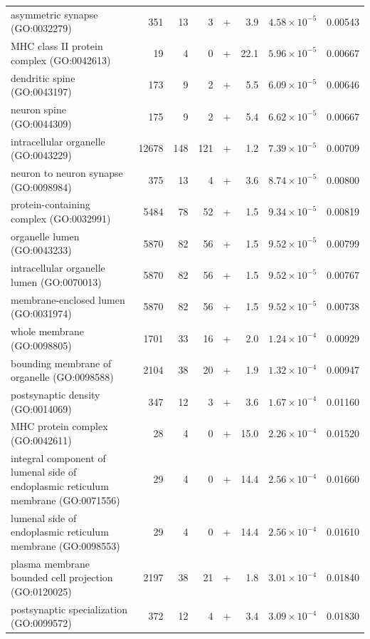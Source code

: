 \begin{table}[ht]
\begin{adjustbox}{width=\textwidth}
\begin{tabular}{lrrrlrrr}
  asymmetric synapse (GO:0032279) & 351 & 13 & 3 & + & 3.9 & $4.58 \times 10^{-5}$ & 0.00543 \\ 
  MHC class II protein complex (GO:0042613) & 19 & 4 & 0 & + & 22.1 & $5.96 \times 10^{-5}$ & 0.00667 \\ 
  dendritic spine (GO:0043197) & 173 & 9 & 2 & + & 5.5 & $6.09 \times 10^{-5}$ & 0.00646 \\ 
  neuron spine (GO:0044309) & 175 & 9 & 2 & + & 5.4 & $6.62 \times 10^{-5}$ & 0.00667 \\ 
  intracellular organelle (GO:0043229) & 12678 & 148 & 121 & + & 1.2 & $7.39 \times 10^{-5}$ & 0.00709 \\ 
  neuron to neuron synapse (GO:0098984) & 375 & 13 & 4 & + & 3.6 & $8.74 \times 10^{-5}$ & 0.00800 \\ 
  protein-containing complex (GO:0032991) & 5484 & 78 & 52 & + & 1.5 & $9.34 \times 10^{-5}$ & 0.00819 \\ 
  organelle lumen (GO:0043233) & 5870 & 82 & 56 & + & 1.5 & $9.52 \times 10^{-5}$ & 0.00799 \\ 
  intracellular organelle lumen (GO:0070013) & 5870 & 82 & 56 & + & 1.5 & $9.52 \times 10^{-5}$ & 0.00767 \\ 
  membrane-enclosed lumen (GO:0031974) & 5870 & 82 & 56 & + & 1.5 & $9.52 \times 10^{-5}$ & 0.00738 \\ 
  whole membrane (GO:0098805) & 1701 & 33 & 16 & + & 2.0 & $1.24 \times 10^{-4}$ & 0.00929 \\ 
  bounding membrane of organelle (GO:0098588) & 2104 & 38 & 20 & + & 1.9 & $1.32 \times 10^{-4}$ & 0.00947 \\ 
  postsynaptic density (GO:0014069) & 347 & 12 & 3 & + & 3.6 & $1.67 \times 10^{-4}$ & 0.01160 \\ 
  MHC protein complex (GO:0042611) & 28 & 4 & 0 & + & 15.0 & $2.26 \times 10^{-4}$ & 0.01520 \\ 
  integral component of lumenal side of endoplasmic reticulum membrane (GO:0071556) & 29 & 4 & 0 & + & 14.4 & $2.56 \times 10^{-4}$ & 0.01660 \\ 
  lumenal side of endoplasmic reticulum membrane (GO:0098553) & 29 & 4 & 0 & + & 14.4 & $2.56 \times 10^{-4}$ & 0.01610 \\ 
  plasma membrane bounded cell projection (GO:0120025) & 2197 & 38 & 21 & + & 1.8 & $3.01 \times 10^{-4}$ & 0.01840 \\ 
  postsynaptic specialization (GO:0099572) & 372 & 12 & 4 & + & 3.4 & $3.09 \times 10^{-4}$ & 0.01830 \\ 

\end{tabular}
\end{adjustbox}
\end{table}

